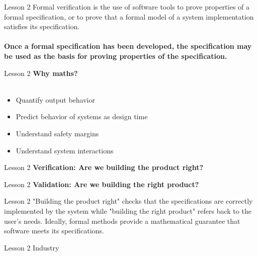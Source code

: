 \documentclass[aspectratio=1610]{beamer}
\begin{document}
\begin{frame}{Lesson 2}{}
\LARGE
    Formal verification is the use of software tools to prove properties of a formal specification, or to prove that a formal model of a system implementation satisfies its specification.\\~\\
\textbf{Once a formal specification has been developed, the specification may be used as the basis for proving properties of the specification.}
\end{frame}

\begin{frame}{Lesson 2}{}
\LARGE
\textbf{Why maths?}\\~\\
\begin{itemize}
    \item Quantify output behavior
    \item Predict behavior of systems as design time
    \item Understand safety margins
    \item Understand system interactions
\end{itemize}
\end{frame}


\begin{frame}{Lesson 2}{}
\LARGE
    \textbf{Verification: Are we building the product right?}

\end{frame}

\begin{frame}{Lesson 2}{}
\LARGE
    \textbf{Validation: Are we building the right product?}
\end{frame}

\begin{frame}{Lesson 2}{}
\LARGE
"Building the product right" checks that the specifications are correctly implemented by the system while "building the right product" refers back to the user's needs. Ideally, formal methods provide a mathematical guarantee that software meets its specifications.
\end{frame}


\begin{frame}{Lesson 2}{}
	\Huge Industry
\end{frame}


\begin{frame}
\end{frame}
\end{document}
